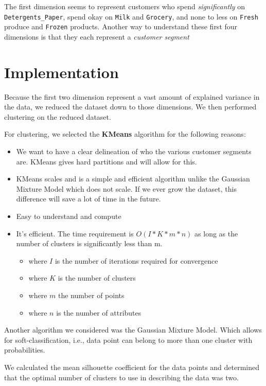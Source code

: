 \documentclass[twoside,openright,titlepage,numbers=noenddot,headinclude,%
               footinclude=true,cleardoublepage=empty,abstractoff,BCOR=5mm,%
               paper=a4,fontsize=11pt,ngerman,american]{scrreprt}
\numberwithin{theorem}{chapter}
\numberwithin{definition}{chapter}
\numberwithin{algorithm}{chapter}
\numberwithin{figure}{chapter}
\numberwithin{table}{chapter}
\numberwithin{equation}{chapter}
\begin{document}
The first dimension seems to represent customers who spend \emph{significantly} on \texttt{Detergents\_Paper}, spend okay on \texttt{Milk} and \texttt{Grocery}, and none to less on \texttt{Fresh} produce and \texttt{Frozen} products. Another way to understand these first four dimensions is that they each represent a \emph{customer segment}

\section*{Implementation}

Because the first two dimension represent a vast amount of explained variance in the data, we reduced the dataset down to those dimensions. We then performed clustering on the reduced dataset. 

For clustering, we selected the \textbf{KMeans} algorithm for the following reasons:
\begin{itemize} 
\item We want to have a clear delineation of who the various customer segments are. KMeans gives hard partitions and will allow for this.  
\item KMeans scales and is a simple and efficient algorithm unlike the Gaussian Mixture Model which does not scale. If we ever grow the dataset, this difference will save a lot of time in the future.  
\item Easy to understand and compute
\item It's efficient. The time requirement is $O(I*K*m*n)$ as long as the number of clusters is significantly less than m.
  \begin{itemize} 
    \item where $I$ is the number of iterations required for convergence
    \item where $K$ is the number of clusters
    \item where $m$ the number of points
    \item where $n$ is the number of attributes
    \end{itemize}  
\end{itemize} 

Another algorithm we considered was the Gaussian Mixture Model. Which allows for soft-classification, i.e., data point can belong to more than one cluster with probabilities.
   

We calculated the mean silhouette coefficient for the data points and determined that the optimal number of clusters to use in describing the data was two. 
\end{document}
